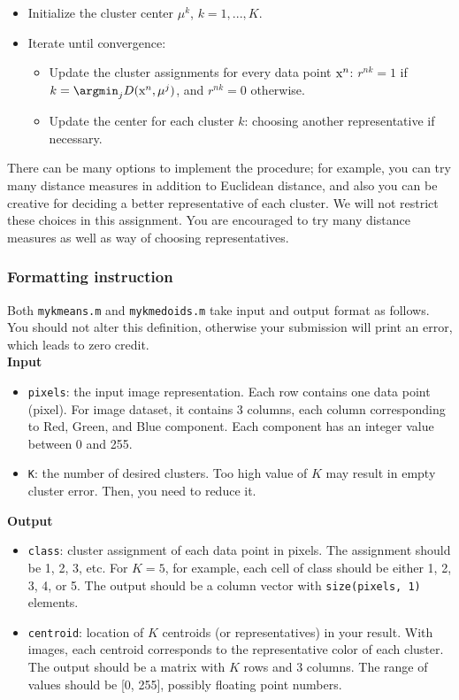 \documentclass[twoside,10pt]{article}
\begin{document}
\begin{itemize}
  \item Initialize the cluster center $\mu^k$, $k = 1, ..., K$.
  \item Iterate until convergence:
  \begin{itemize}
    \item Update the cluster assignments for every data point $\text x^n$: $r^{nk} = 1$ if $k = \argmin_j D(\text x^n, \mu^j)$, and $r^{nk} = 0$ otherwise.
    \item Update the center for each cluster $k$: choosing another representative if necessary.
  \end{itemize}
\end{itemize}

There can be many options to implement the procedure; for example, you can try many distance measures in addition to Euclidean distance, and also you can be creative for deciding a better representative of each cluster. We will not restrict these choices in this assignment. You are encouraged to try many distance measures as well as way of choosing representatives.


\subsubsection*{Formatting instruction}

Both \texttt{mykmeans.m} and \texttt{mykmedoids.m} take input and output format as follows. You should not alter this definition, otherwise your submission will print an error, which leads to zero credit.\\

\textbf{Input}
\begin{itemize}
  \item \texttt{pixels}: the input image representation. Each row contains one data point (pixel). For image dataset, it contains 3 columns, each column corresponding to Red, Green, and Blue component. Each component has an integer value between 0 and 255.
  \item \texttt{K}: the number of desired clusters. Too high value of $K$ may result in empty cluster error. Then, you need to reduce it.
\end{itemize}

\textbf{Output}
\begin{itemize}
  \item \texttt{class}: cluster assignment of each data point in pixels. The assignment should be 1, 2, 3, etc. For $K = 5$, for example, each cell of class should be either 1, 2, 3, 4, or 5. The output should be a column vector with \texttt{size(pixels, 1)} elements.
  \item \texttt{centroid}: location of $K$ centroids (or representatives) in your result. With images, each centroid corresponds to the representative color of each cluster. The output should be a matrix with $K$ rows and 3 columns. The range of values should be [0, 255], possibly floating point numbers.
\end{itemize}
\end{document}
